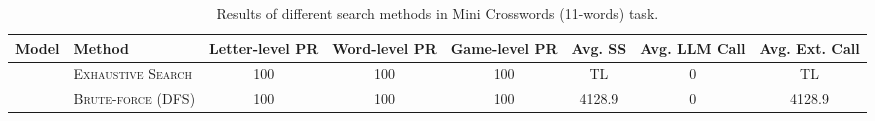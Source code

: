 \begin{table*}[t]
\caption{Results of different search methods in Mini Crosswords (11-words) task.}
\centering
\small
\tabcolsep 3.5pt
\renewcommand\arraystretch{1.0}
\begin{tabular}{ll|cccccc}
\toprule
Model & Method & Letter-level PR & Word-level PR & Game-level PR & Avg. SS & Avg. LLM Call & Avg. Ext. Call \\
\midrule
&\textsc{Exhaustive Search}&\num{100} &\num{100} &\num{100} &{TL} &\num{0} & {TL}\\
& \textsc{Brute-force (DFS)} &\num{100}&\num{100}& \num{100} & \num{4128.9} & \num{0} &  \num{4128.9}  \\


\end{tabular}
\end{table*}
